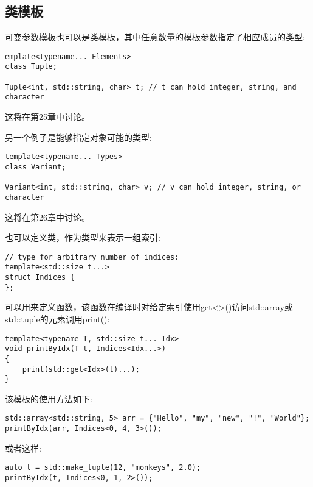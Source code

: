 \subsection{类模板}

可变参数模板也可以是类模板，其中任意数量的模板参数指定了相应成员的类型:

\begin{lstlisting}[style=styleCXX]
emplate<typename... Elements>
class Tuple;

Tuple<int, std::string, char> t; // t can hold integer, string, and character
\end{lstlisting}

这将在第25章中讨论。

另一个例子是能够指定对象可能的类型:

\begin{lstlisting}[style=styleCXX]
template<typename... Types>
class Variant;

Variant<int, std::string, char> v; // v can hold integer, string, or character
\end{lstlisting}

这将在第26章中讨论。

也可以定义类，作为类型来表示一组索引:

\begin{lstlisting}[style=styleCXX]
// type for arbitrary number of indices:
template<std::size_t...>
struct Indices {
};
\end{lstlisting}

可以用来定义函数，该函数在编译时对给定索引使用get<>()访问std::array或std::tuple的元素调用print():

\begin{lstlisting}[style=styleCXX]
template<typename T, std::size_t... Idx>
void printByIdx(T t, Indices<Idx...>)
{
	print(std::get<Idx>(t)...);
}
\end{lstlisting}

该模板的使用方法如下:

\begin{lstlisting}[style=styleCXX]
std::array<std::string, 5> arr = {"Hello", "my", "new", "!", "World"};
printByIdx(arr, Indices<0, 4, 3>());
\end{lstlisting}

或者这样:

\begin{lstlisting}[style=styleCXX]
auto t = std::make_tuple(12, "monkeys", 2.0);
printByIdx(t, Indices<0, 1, 2>());
\end{lstlisting}

